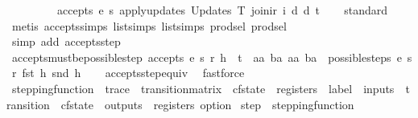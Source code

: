 \begin{isabellebody}
\ \ \ \ \ \ \ \ \ accepts\ e\ s{\isacharprime}\ {\isacharparenleft}apply{\isacharunderscore}updates\ {\isacharparenleft}Updates\ T{\isacharparenright}\ {\isacharparenleft}join{\isacharunderscore}ir\ i\ d{\isacharparenright}\ d{\isacharparenright}\ t{\isacharparenright}{\isachardoublequoteclose}\isanewline
%
\isadelimproof
\ \ %
\endisadelimproof
%
\isatagproof
{}\isamarkupfalse%
\ standard\isanewline
\ \ \ \isamarkupfalse%
\ {\isacharparenleft}metis\ accepts{\isachardot}simps\ list{\isachardot}simps{\isacharparenleft}{}{\isacharparenright}\ list{\isachardot}simps{\isacharparenleft}{}{\isacharparenright}\ prod{\isachardot}sel{\isacharparenleft}{}{\isacharparenright}\ prod{\isachardot}sel{\isacharparenleft}{}{\isacharparenright}{\isacharparenright}\isanewline
\ \ \isamarkupfalse%
\ {\isacharparenleft}simp\ add{\isacharcolon}\ accepts{\isachardot}step{\isacharparenright}%
\endisatagproof
{\isafoldproof}%
%
\isadelimproof
\isanewline
%
\endisadelimproof
\isanewline
{}\isamarkupfalse%
\ accepts{\isacharunderscore}must{\isacharunderscore}be{\isacharunderscore}possible{\isacharunderscore}step{\isacharcolon}\ {\isachardoublequoteopen}accepts\ e\ s\ r\ {\isacharparenleft}h\ {\isacharhash}\ t{\isacharparenright}\ {\isasymLongrightarrow}\ {\isasymexists}aa\ ba{\isachardot}\ {\isacharparenleft}aa{\isacharcomma}\ ba{\isacharparenright}\ {\isacharbar}{\isasymin}{\isacharbar}\ possible{\isacharunderscore}steps\ e\ s\ r\ {\isacharparenleft}fst\ h{\isacharparenright}\ {\isacharparenleft}snd\ h{\isacharparenright}{\isachardoublequoteclose}\isanewline
%
\isadelimproof
\ \ %
\endisadelimproof
%
\isatagproof
{}\isamarkupfalse%
\ accepts{\isacharunderscore}step{\isacharunderscore}equiv\ \isamarkupfalse%
\ fastforce%
\endisatagproof
{\isafoldproof}%
%
\isadelimproof
\isanewline
%
\endisadelimproof
\isanewline
{}\isamarkupfalse%
\ stepping{\isacharunderscore}function\ {\isacharequal}\ {\isachardoublequoteopen}trace\ {\isasymRightarrow}\ transition{\isacharunderscore}matrix\ {\isasymRightarrow}\ cfstate\ {\isasymRightarrow}\ registers\ {\isasymRightarrow}\ label\ {\isasymRightarrow}\ inputs\ {\isasymRightarrow}\ {\isacharparenleft}transition\ {\isasymtimes}\ cfstate\ {\isasymtimes}\ outputs\ {\isasymtimes}\ registers{\isacharparenright}\ option{\isachardoublequoteclose}\isanewline
\isanewline
{}\isamarkupfalse%
\ step\ {\isacharcolon}{\isacharcolon}\ stepping{\isacharunderscore}function\ \isanewline

\end{isabellebody}
